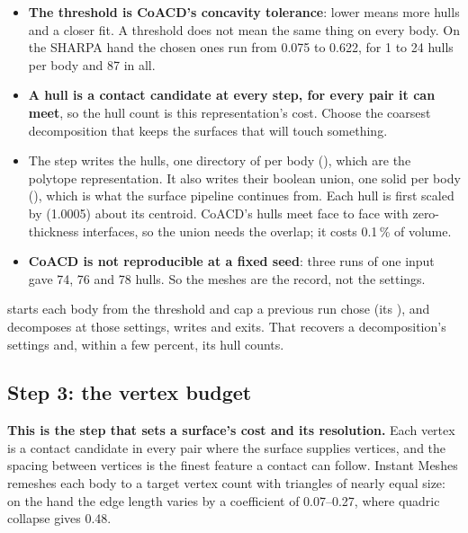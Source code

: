\begin{itemize}
\item \textbf{The threshold is CoACD's concavity tolerance}: lower means more hulls and a closer fit. A threshold does not mean the same thing on every body. On the SHARPA hand the chosen ones run from 0.075 to 0.622, for 1 to 24 hulls per body and 87 in all.
\item \textbf{A hull is a contact candidate at every step, for every pair it can meet}, so the hull count is this representation's cost. Choose the coarsest decomposition that keeps the surfaces that will touch something.
\item The step writes the hulls, one directory of  per body (), which are the polytope representation. It also writes their boolean union, one solid per body (), which is what the surface pipeline continues from. Each hull is first scaled by  (1.0005) about its centroid. CoACD's hulls meet face to face with zero-thickness interfaces, so the union needs the overlap; it costs 0.1\,\% of volume.
\item \textbf{CoACD is not reproducible at a fixed seed}: three runs of one input gave 74, 76 and 78 hulls. So the meshes are the record, not the settings.
\end{itemize}

 starts each body from the threshold and cap a previous run chose (its ), and  decomposes at those settings, writes and exits. That recovers a decomposition's settings and, within a few percent, its hull counts.

\subsection{Step 3: the vertex budget}\label{sec:step3}

\textbf{This is the step that sets a surface's cost and its resolution.} Each vertex is a contact candidate in every pair where the surface supplies vertices, and the spacing between vertices is the finest feature a contact can follow. Instant Meshes \cite{instantmeshes} remeshes each body to a target vertex count with triangles of nearly equal size: on the hand the edge length varies by a coefficient of 0.07--0.27, where quadric collapse gives 0.48.

